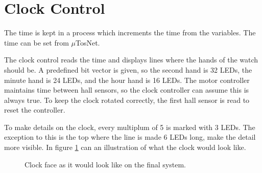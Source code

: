 \section{Clock Control}
The time is kept in a process which increments the time from the variables.
The time can be set from $\mu$TosNet.

The clock control reads the time and displays lines where the hands of the watch should be.
A predefined bit vector is given, so the second hand is 32 LEDs, the minute hand is 24 LEDs, and the hour hand is 16 LEDs.
The motor controller maintains time between hall sensors, so the clock controller can assume this is always true.
To keep the clock rotated correctly, the first hall sensor is read to reset the controller.

To make details on the clock, every multiplum of 5 is marked with 3 LEDs.
The exception to this is the top where the line is made 6 LEDs long, make the detail more visible.
In figure \ref{fig:clock_face} can an illustration of what the clock would look like.

\begin{figure}[h]
\centering
{}
 \caption{Clock face as it would look like on the final system.}
 \label{fig:clock_face}
\end{figure}